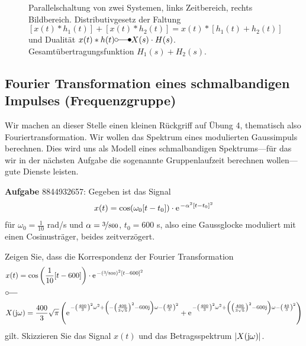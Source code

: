 \begin{figure}
\caption{Parallelschaltung von zwei Systemen, links Zeitbereich, rechts Bildbereich.
Distributivgesetz der Faltung
$[x(t)\ast h_1(t)]+[x(t) \ast h_2(t)] = x(t) \ast [h_1(t)+h_2(t)]$
und Dualität $x(t)\ast h(t) \laplace X(s) \cdot H(s)$.
Gesamtübertragungsfunktion $H_1(s) + H_2(s)$.}
\label{fig:tikz_parallel_081294E23C}
\end{figure}

















\clearpage
\subsection{Fourier Transformation eines schmalbandigen Impulses (Frequenzgruppe)}
\label{sec:8844932657}
\begin{Ziel}
Wir machen an dieser Stelle einen kleinen Rückgriff auf Übung 4, thematisch
also Fouriertransformation.
Wir wollen das Spektrum eines modulierten Gaussimpuls berechnen.
Dies wird uns als Modell eines schmalbandigen Spektrums---für das wir in der nächsten
Aufgabe die sogenannte Gruppenlaufzeit berechnen wollen---gute
Dienste leisten.
\end{Ziel}
\textbf{Aufgabe} {\tiny 8844932657}: Gegeben ist das Signal
\begin{align}
  x(t) = \cos(\omega_0 [t-t_0]) \cdot \e^{-\alpha^2 [t-t_0]^2}
\end{align}
für $\omega_0 = \frac{1}{10}$ rad/s und $\alpha=\nicefrac{3}{800}$, $t_0 = 600$ s,
also eine Gaussglocke moduliert mit einen Cosinusträger, beides zeitverzögert.

Zeigen Sie, dass die Korrespondenz der Fourier Transformation
\begin{align}
  &x(t) = \cos\left(\frac{1}{10} [t-600]\right) \cdot \e^{-\left(\nicefrac{3}{800}\right)^2 [t-600]^2}\\
  &\fourier\nonumber\\
  &X(\im\omega) = \frac{400}{3}\sqrt{\pi}\left(
  \e^{-\left(\frac{400}{3}\right)^2 \omega^2 + \left(-\left(\frac{400}{3\sqrt{5}}\right)^2-600\im\right)\omega - \left(\frac{40}{3}\right)^2}+
  \e^{-\left(\frac{400}{3}\right)^2 \omega^2 + \left(\left(\frac{400}{3\sqrt{5}}\right)^2-600\im\right)\omega - \left(\frac{40}{3}\right)^2}\right)
\end{align}
gilt.
Skizzieren Sie das Signal $x(t)$ und das Betragsspektrum $|X(\im\omega)|$.


